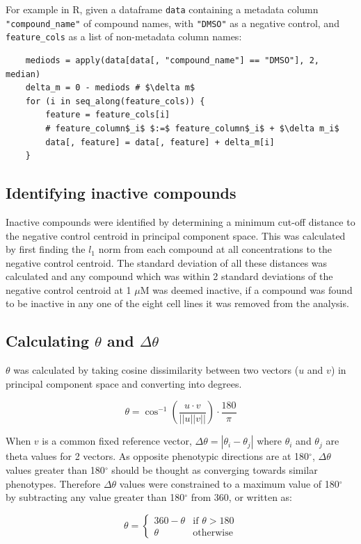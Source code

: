 \documentclass[a4paper,11pt,twoside,openright]{scrbook}
\begin{document}
For example in R, given a dataframe \texttt{data} containing a metadata column \texttt{"compound\_name"} of compound names, with \texttt{"DMSO"} as a negative control, and \texttt{feature\_cols} as a list of non-metadata column names:


\begin{verbatim}
    mediods = apply(data[data[, "compound_name"] == "DMSO"], 2, median)
    delta_m = 0 - mediods # $\delta m$
    for (i in seq_along(feature_cols)) {
        feature = feature_cols[i]
        # feature_column$_i$ $:=$ feature_column$_i$ + $\delta m_i$
        data[, feature] = data[, feature] + delta_m[i]
    }
\end{verbatim}


\subsection{Identifying inactive compounds}

Inactive compounds were identified by determining a minimum cut-off distance to the negative control centroid in principal component space.
This was calculated by first finding the $l_1$ norm from each compound at all concentrations to the negative control centroid.
The standard deviation of all these distances was calculated and any compound which was within 2 standard deviations of the negative control centroid at 1 $\mu$M was deemed inactive, if a compound was found to be inactive in any one of the eight cell lines it was removed from the analysis.


\subsection{Calculating $\theta$ and $\Delta\theta$}

$\theta$ was calculated by taking cosine dissimilarity between two vectors ($u$ and $v$) in principal component space and converting into degrees.

\begin{equation} \label{equation:theta}
        \theta = \cos^{-1} \left( \frac{u \cdot v}{||u||v||} \right) \cdot \frac{180}{\pi}
\end{equation}

When $v$ is a common fixed reference vector, $\Delta\theta = |\theta_i - \theta_j|$ where $\theta_i$ and $\theta_j$ are theta values for 2 vectors.
As opposite phenotypic directions are at 180$^\circ$, $\Delta\theta$ values greater than 180$^\circ$ should be thought as converging towards similar phenotypes.
Therefore $\Delta\theta$ values were constrained to a maximum value of 180$^\circ$ by subtracting any value greater than 180$^\circ$ from 360, or written as:

\begin{equation}
\theta = 
    \begin{cases}
        360 - \theta & \text{if } \theta > 180\\
        \theta       & \text{otherwise}
    \end{cases}
\end{equation}
\end{document}
